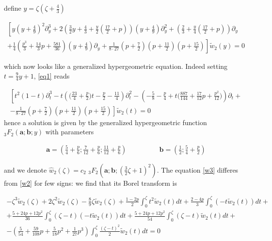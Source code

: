 \documentclass{article}
\theoremstyle{definition}
\begin{document}
define $y=\zeta\left(\zeta+\frac{4}{3}\right)$

\begin{multline}\label{eq1}
\left[y\left(y+\frac{4}{9}\right)^2\partial_y^3+2\left(\frac{3}{2}y+\frac{4}{3}+\frac{y}{2}\left(\frac{17}{2}+p\right)\right)\left(y+\frac{4}{9}\right)\partial_y^2+\left(\frac{2}{3}+\frac{y}{4}\left(\frac{17}{2}+p\right)\right)\partial_y\right.\\
\left.+\frac{1}{4}\left(\frac{p^3}{3}+\frac{14}{3}p+\frac{581}{36}\right)\left(y+\frac{4}{9}\right)\partial_y+\frac{1}{8\cdot 27}\left(p+\frac{7}{2}\right)\left(p+\frac{11}{2}\right)\left(p+\frac{15}{2}\right)\right]\tilde{w}_2(y)=0
\end{multline}

which now looks like a generalized hypergeometric equation. Indeed setting $t=\tfrac{9}{4}y+1$, \eqref{eq1} reads

\begin{multline}
\left[t^2(1-t)\partial_t^3-t\left(\big(\frac{23}{4}+\frac{p}{2}\big)t-\frac{p}{2}-\frac{11}{4}\right)\partial_t^2-\left(-\frac{5}{8}-\frac{p}{4}+t\Big(\frac{887}{144}+\frac{17}{12}p+\frac{p^2}{12}\Big)\right)\partial_t +\right.\\
\left. -\frac{1}{8\cdot 27}\left(p+\frac{7}{2}\right)\left(p+\frac{11}{2}\right)\left(p+\frac{15}{2}\right)\right]\tilde{w}_2(t)=0
\end{multline}
hence a solution is given by the generalized hypergeometric function ${}_3F_2\left(\mathbf{a};\mathbf{b};y\right)$ with parameters

\begin{align*}
\mathbf{a}=\left(\frac{5}{4}+\frac{p}{6};\frac{7}{12}+\frac{p}{6};\frac{11}{12}+\frac{p}{6}\right) & \qquad\qquad \mathbf{b}=\left(\frac{1}{2};\frac{5}{4}+\frac{p}{2}\right)
\end{align*}

and we denote $\hat{w}_2(\zeta)=c_2\,\, {}_3F_2\left(\mathbf{a};\mathbf{b};\left(\tfrac{3}{2}\zeta+1\right)^2\right)$. The equation \eqref{w3} differes from \eqref{w2} for few signs: we find that its Borel transform is 

\begin{multline}
-\zeta^3\tilde{w}_2(\zeta)+2\zeta^2\tilde{w}_2(\zeta)-\frac{8}{9}\zeta\tilde{w}_2(\zeta)+\frac{1-2p}{2}\int_0^\zeta t^2\tilde{w}_2(t)dt+\frac{2-4p}{3}\int_0^\zeta(-t\tilde{w}_2(t))dt+\\
+\frac{5+24p+12p^2}{36}\int_0^\zeta(\zeta-t)(-t\tilde{w}_2(t))dt
+\frac{5+24p+12p^2}{54}\int_0^\zeta(\zeta-t)\tilde{w}_2(t)dt +\\
-\left(\frac{5}{54}+\frac{59}{108}p+\frac{5}{18}p^2+\frac{1}{27}p^3\right)\int_0^\zeta\frac{(\zeta-t)^2}{2}\tilde{w}_2(t)dt=0
\end{multline}
\end{document}
